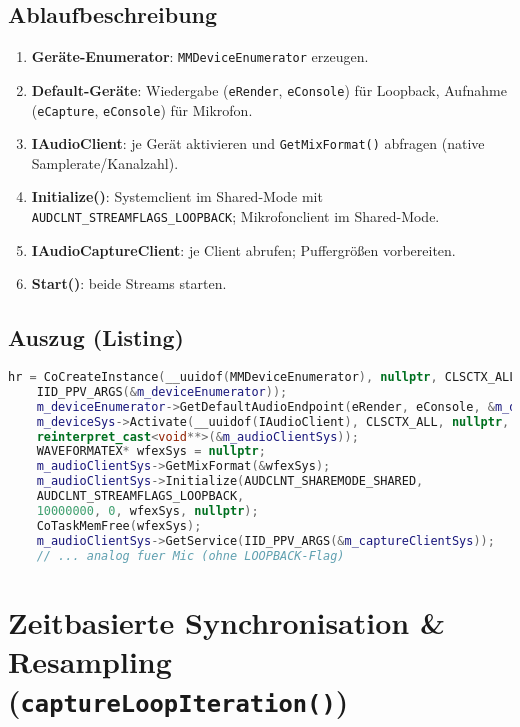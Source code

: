 \subsection*{Ablaufbeschreibung}
\begin{enumerate}
    \item \textbf{Geräte-Enumerator}: \texttt{MMDeviceEnumerator} erzeugen.
    \item \textbf{Default-Geräte}: Wiedergabe (\texttt{eRender}, \texttt{eConsole})
    für Loopback, Aufnahme (\texttt{eCapture}, \texttt{eConsole}) für Mikrofon.
    \item \textbf{IAudioClient}: je Gerät aktivieren und \texttt{GetMixFormat()} abfragen
    (native Samplerate/Kanalzahl).
    \item \textbf{Initialize()}: Systemclient im Shared-Mode mit
    \texttt{AUDCLNT\_STREAMFLAGS\_LOOPBACK}; Mikrofonclient im Shared-Mode.
    \item \textbf{IAudioCaptureClient}: je Client abrufen; Puffergrößen vorbereiten.
    \item \textbf{Start()}: beide Streams starten.
\end{enumerate}



\subsection*{Auszug (Listing)}
\begin{lstlisting}[language=C++,caption={WASAPI-Setup (vereinfacht)},label={lst:wasapi_init}]
    hr = CoCreateInstance(__uuidof(MMDeviceEnumerator), nullptr, CLSCTX_ALL,
    IID_PPV_ARGS(&m_deviceEnumerator));
    m_deviceEnumerator->GetDefaultAudioEndpoint(eRender, eConsole, &m_deviceSys);
    m_deviceSys->Activate(__uuidof(IAudioClient), CLSCTX_ALL, nullptr,
    reinterpret_cast<void**>(&m_audioClientSys));
    WAVEFORMATEX* wfexSys = nullptr;
    m_audioClientSys->GetMixFormat(&wfexSys);
    m_audioClientSys->Initialize(AUDCLNT_SHAREMODE_SHARED,
    AUDCLNT_STREAMFLAGS_LOOPBACK,
    10000000, 0, wfexSys, nullptr);
    CoTaskMemFree(wfexSys);
    m_audioClientSys->GetService(IID_PPV_ARGS(&m_captureClientSys));
    // ... analog fuer Mic (ohne LOOPBACK-Flag)
\end{lstlisting}


\section{Zeitbasierte Synchronisation \& Resampling (\texttt{captureLoopIteration()})}
\label{sec:wasapi_loop}


